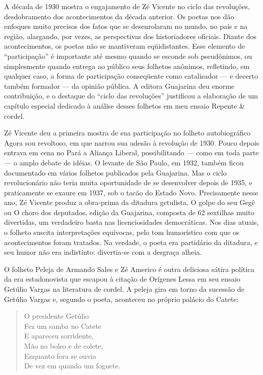 A década de 1930 mostra o engajamento de Zé Vicente no ciclo das
revoluções, desdobramento dos acontecimentos da década anterior. Os
poetas nos dão enfoques muito precisos dos fatos que se desenrolaram
no mundo, no país e na região, alargando, por vezes, as perspectivas
dos historiadores oficiais. Diante dos acontecimentos, os poetas não
se mantiveram eqüidistantes. Esse elemento de “participação” é
importante até mesmo quando se esconde sob pseudônimos, ou
simplesmente quando entrega ao público seus folhetos anônimos,
refletindo, em qualquer caso, a forma de participação conseqüente
como catalisador — e decerto também formador — da opinião pública. A
editora Guajarina deu enorme contribuição, e o destaque do “ciclo das
revoluções” justificou a elaboração de um capítulo especial dedicado
à análise desses folhetos em meu ensaio Repente \& cordel. 


Zé Vicente deu a primeira mostra de sua participação no folheto
autobiográfico Agora sou revoltoso, em que narrou sua adesão à
revolução de 1930. Pouco depois entrava em cena no Pará a Aliança
Liberal, possibilitando — como em toda parte — o amplo debate de
idéias. O levante de São Paulo, em 1932, também ficou documentado em
vários folhetos publicados pela Guajarina. Mas o ciclo revolucionário
não teria muita oportunidade de se desenvolver depois de 1935, e
praticamente se exaure em 1937, sob o tacão do Estado Novo.
Precisamente nesse ano, Zé Vicente produz a obra-prima da ditadura
getulista, O golpe do seu Gegê ou O choro dos deputados, edição da
Guajarina, composta de 62 sextilhas muito divertidas, um verdadeiro
basta nas licenciosidades democráticas. Nos dias atuais, o folheto
suscita interpretações equívocas, pelo tom humorístico com que os
acontecimentos foram tratados. Na verdade, o poeta era partidário da
ditadura, e seu humor não era indistinto: divertia-se com a desgraça
alheia.

O folheto Peleja de Armando Sales e Zé Americo é outra deliciosa
sátira política da era estadonovista que escapou à citação de
Orígenes Lessa em seu ensaio Getúlio Vargas na literatura de cordel.
A peleja gira em torno da sucessão de Getúlio Vargas e, segundo o
poeta, aconteceu no próprio palácio do Catete: 

\begin{verse}
O presidente Getúlio\\
Fez um samba no Catete\\
E apareceu sorridente,\\
Mão no bolso e de colete,\\
Enquanto fora se ouvia\\
De vez em quando um foguete.
\end{verse}

